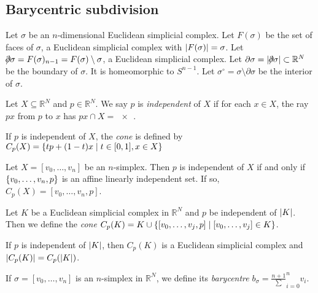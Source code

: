 \subsection{Barycentric subdivision}
\begin{definition}
	Let \( \sigma \) be an \( n \)-dimensional Euclidean simplicial complex.
	Let \( F(\sigma) \) be the set of faces of \( \sigma \), a Euclidean simplicial complex with \( \abs{F(\sigma)} = \sigma \).
	Let \( \bound \sigma = F(\sigma)_{n-1} = F(\sigma) \setminus \sigma \), a Euclidean simplicial complex.
	Let \( \partial \sigma = \abs{\bound \sigma} \subset \mathbb R^N \) be the boundary of \( \sigma \).
	It is homeomorphic to \( S^{n-1} \).
	Let \( \sigma^\circ = \sigma \setminus \partial \sigma \) be the interior of \( \sigma \).
\end{definition}
\begin{definition}
	Let \( X \subseteq \mathbb R^N \) and \( p \in \mathbb R^N \).
	We say \( p \) is \emph{independent} of \( X \) if for each \( x \in X \), the ray \( px \) from \( p \) to \( x \) has \( px \cap X = \qty{x} \).
\end{definition}
\begin{definition}
	If \( p \) is independent of \( X \), the \emph{cone} is defined by \( C_p(X) = \qty{tp + (1-t)x \mid t \in [0,1], x \in X} \)
\end{definition}
\begin{example}
	Let \( X = [v_0,\dots,v_n] \) be an \( n \)-simplex.
	Then \( p \) is independent of \( X \) if and only if \( \qty{v_0, \dots, v_n, p} \) is an affine linearly independent set.
	If so, \( C_p(X) = [v_0, \dots, v_n, p] \).
\end{example}
\begin{definition}
	Let \( K \) be a Euclidean simplicial complex in \( \mathbb R^N \) and \( p \) be independent of \( \abs{K} \).
	Then we define the \emph{cone} \( C_p(K) = K \cup \qty{[v_0, \dots, v_j, p] \mid [v_0, \dots, v_j] \in K} \).
\end{definition}
\begin{lemma}
	If \( p \) is independent of \( \abs{K} \), then \( C_p(K) \) is a Euclidean simplicial complex and \( \abs{C_p(K)} = C_p(\abs{K}) \).
\end{lemma}
\begin{definition}
	If \( \sigma = [v_0, \dots, v_n] \) is an \( n \)-simplex in \( \mathbb R^N \), we define its \emph{barycentre} \( b_\sigma = \frac{n+1}\sum_{i=0}^n v_i \).
\end{definition}
